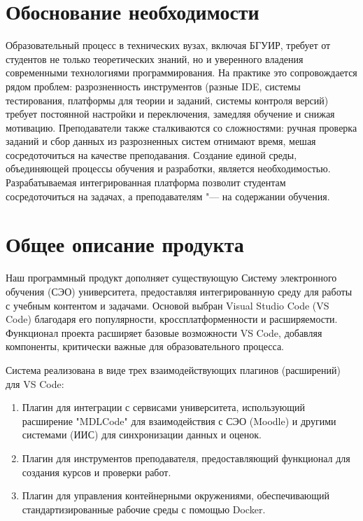 \documentclass{bsuir}
\begin{document}
\maketitle

\mainmatter

\section{Обоснование необходимости}

Образовательный процесс в технических вузах, включая БГУИР, требует от студентов
не только теоретических знаний, но и уверенного владения современными
технологиями программирования. На практике это сопровождается рядом проблем:
разрозненность инструментов (разные IDE, системы тестирования, платформы для
теории и заданий, системы контроля версий) требует постоянной настройки и
переключения, замедляя обучение и снижая мотивацию. Преподаватели также
сталкиваются со сложностями: ручная проверка заданий и сбор данных из
разрозненных систем отнимают время, мешая сосредоточиться на качестве
преподавания. Создание единой среды, объединяющей процессы обучения и
разработки, является необходимостью. Разрабатываемая интегрированная платформа
позволит студентам сосредоточиться на задачах, а преподавателям "--- на
содержании обучения.

\section{Общее описание продукта}

Наш программный продукт дополняет существующую Систему электронного обучения
(СЭО) университета, предоставляя интегрированную среду для работы с учебным
контентом и задачами. Основой выбран Visual Studio Code (VS Code) благодаря его
популярности, кроссплатформенности и расширяемости. Функционал проекта расширяет
базовые возможности VS Code, добавляя компоненты, критически важные для
образовательного процесса.

Система реализована в виде трех взаимодействующих плагинов (расширений) для VS Code:

\begin{enumerate}

	\item Плагин для интеграции с сервисами университета, использующий
	      расширение "MDLCode" для взаимодействия с СЭО (Moodle) и другими системами
	      (ИИС) для синхронизации данных и оценок.

	\item Плагин для инструментов преподавателя, предоставляющий функционал для
	      создания курсов и проверки работ.

	\item Плагин для управления контейнерными окружениями, обеспечивающий
	      стандартизированные рабочие среды с помощью Docker.

\end{enumerate}
\end{document}
